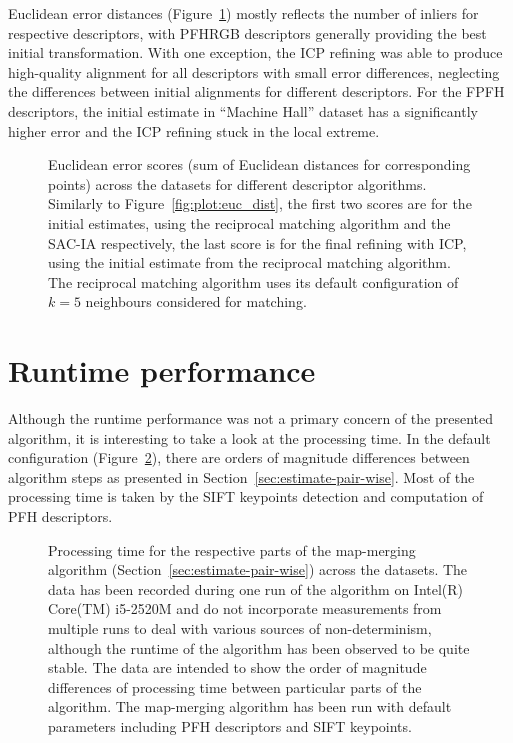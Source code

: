 Euclidean error distances (Figure~\ref{fig:plot:desc_dist}) mostly reflects the number of inliers for respective descriptors, with \gls{PFHRGB} descriptors generally providing the best initial transformation. With one exception, the \gls{ICP} refining was able to produce high-quality alignment for all descriptors with small error differences, neglecting the differences between initial alignments for different descriptors. For the \gls{FPFH} descriptors, the initial estimate in ``Machine Hall'' dataset has a significantly higher error and the \gls{ICP} refining stuck in the local extreme.

\begin{figure}
  \centering
  
  \caption[Euclidean error scores per descriptors]{Euclidean error scores (sum of Euclidean distances for corresponding points) across the datasets for different descriptor algorithms. Similarly to Figure~\ref{fig:plot:euc_dist}, the first two scores are for the initial estimates, using the reciprocal matching algorithm and the \gls{SAC-IA} respectively, the last score is for the final refining with \gls{ICP}, using the initial estimate from the reciprocal matching algorithm. The reciprocal matching algorithm uses its default configuration of $k=5$ neighbours considered for matching.}
  \label{fig:plot:desc_dist}
\end{figure}

\section{Runtime performance}
\label{sec:runtime-perf}

Although the runtime performance was not a primary concern of the presented algorithm, it is interesting to take a look at the processing time. In the default configuration (Figure~\ref{fig:plot:perf}), there are orders of magnitude differences between algorithm steps as presented in Section~\ref{sec:estimate-pair-wise}. Most of the processing time is taken by the \gls{SIFT} keypoints detection and computation of \gls{PFH} descriptors.

\begin{figure}
  \centering
  
  \caption[Processing time per algorithm parts]{Processing time for the respective parts of the map-merging algorithm (Section~\ref{sec:estimate-pair-wise}) across the datasets. The data has been recorded during one run of the algorithm on Intel(R) Core(TM) i5-2520M and do not incorporate measurements from multiple runs to deal with various sources of non-determinism, although the runtime of the algorithm has been observed to be quite stable. The data are intended to show the order of magnitude differences of processing time between particular parts of the algorithm. The map-merging algorithm has been run with default parameters including \gls{PFH} descriptors and \gls{SIFT} keypoints.}
  \label{fig:plot:perf}
\end{figure}

